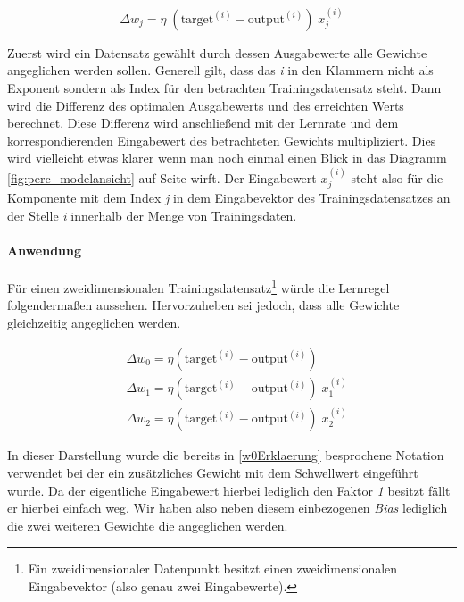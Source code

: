\begin{equation} \label{eq:lernRegel}
\Delta w_j = \eta \; (\text{target}^{(i)} - \text{output}^{(i)})\;x^{(i)}_{j}
\end{equation}

Zuerst wird ein Datensatz gewählt durch dessen Ausgabewerte alle Gewichte angeglichen werden sollen. Generell gilt, dass das \emph{i} in den Klammern nicht als Exponent sondern als Index für den betrachten Trainingsdatensatz steht. Dann wird die Differenz des optimalen Ausgabewerts und des erreichten Werts berechnet. Diese Differenz wird anschließend mit der Lernrate und dem korrespondierenden Eingabewert des betrachteten Gewichts multipliziert. Dies wird vielleicht etwas klarer wenn man noch einmal einen Blick in das Diagramm \ref{fig:perc_modelansicht} auf Seite \pageref{fig:perc_modelansicht} wirft. Der Eingabewert $x^{(i)}_{j}$ steht also für die Komponente mit dem Index \emph{j} in dem Eingabevektor des Trainingsdatensatzes an der Stelle \emph{i} innerhalb der Menge von Trainingsdaten.


\paragraph{Anwendung}

Für einen zweidimensionalen Trainingsdatensatz\footnote{Ein zweidimensionaler Datenpunkt besitzt einen zweidimensionalen Eingabevektor (also genau zwei Eingabewerte).} würde die Lernregel folgendermaßen aussehen. Hervorzuheben sei jedoch, dass alle Gewichte gleichzeitig angeglichen werden.

\begin{equation} \label{eq:lernRegAnw}
\begin{aligned}
& \Delta w_0 = \eta(\text{target}^{(i)} - \text{output}^{(i)}) \\
& \Delta w_1 = \eta(\text{target}^{(i)} - \text{output}^{(i)})\;x^{(i)}_{1} \\
& \Delta w_2 = \eta(\text{target}^{(i)} - \text{output}^{(i)})\;x^{(i)}_{2}
\end{aligned}
\end{equation}

In dieser Darstellung wurde die bereits in \ref{w0Erklaerung} besprochene Notation verwendet bei der ein zusätzliches Gewicht mit dem Schwellwert eingeführt wurde. Da der eigentliche Eingabewert hierbei lediglich den Faktor \emph{1} besitzt fällt er hierbei einfach weg. Wir haben also neben diesem einbezogenen \emph{Bias} lediglich die zwei weiteren Gewichte die angeglichen werden.

